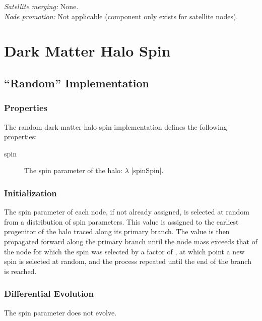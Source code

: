 \noindent\emph{Satellite merging:} None.\\

\noindent\emph{Node promotion:} Not applicable (component only exists for satellite nodes).\\

\section{Dark Matter Halo Spin}\label{sec:DarkMatterHaloSpinComponent}

\subsection{``Random'' Implementation}

\subsubsection{Properties}

The random dark matter halo spin implementation defines the following properties:
\begin{description}
 \item [{\normalfont \ttfamily spin}] The spin parameter of the halo: $\lambda$ [{\normalfont \ttfamily spinSpin}].
\end{description}

\subsubsection{Initialization}

The spin parameter of each node, if not already assigned, is selected at random from a distribution of spin parameters. This value is assigned to the earliest progenitor of the halo traced along its primary branch. The value is then propagated forward along the primary branch until the \gls{node} mass exceeds that of the \gls{node} for which the spin was selected by a factor of {\normalfont \ttfamily [randomSpinResetMassFactor]}, at which point a new spin is selected at random, and the process repeated until the end of the branch is reached. 

\subsubsection{Differential Evolution}

The spin parameter does not evolve.

